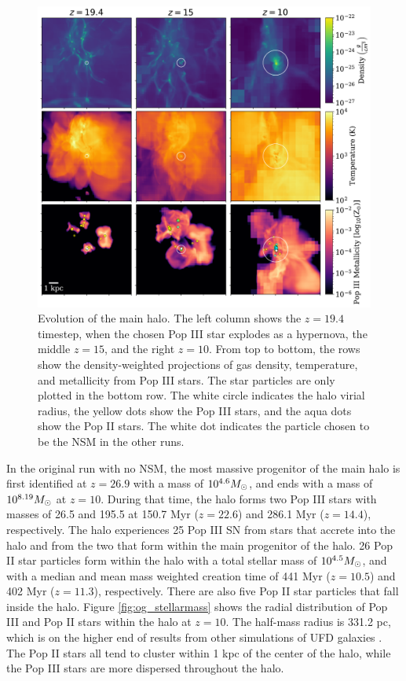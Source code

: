 \documentclass[fleqn,usenatbib]{mnras}
\begin{document}
\begin{figure} 
	\includegraphics[width=\textwidth]{plots/OG_evolution.pdf}
	\caption[Projections of the density, temperature and Pop III metallicity of the main halo through time.]{Evolution of the main halo. The left column shows the $z = 19.4$ timestep, when the chosen Pop III star explodes as a hypernova, the middle $z = 15$, and the right $z = 10$. From top to bottom, the rows show the density-weighted projections of gas density, temperature, and metallicity from Pop III stars. The star particles are only plotted in the bottom row. The white circle indicates the halo virial radius, the yellow dots show the Pop III stars, and the aqua dots show the Pop II stars. The white dot indicates the particle chosen to be the NSM in the other runs.}
	\label{fig:og_evolution}
\end{figure}

In the original run with no NSM, the most massive progenitor of the main halo is first identified at $z = 26.9$ with a mass of $10^{4.6} \Ms$, and ends with a mass of $10^{8.19} \Ms$ at $z = 10$. During that time, the halo forms two Pop III stars with masses of 26.5 \Ms{} and 195.5 \Ms{} at 150.7 Myr ($z = 22.6$) and 286.1 Myr ($z = 14.4$), respectively. The halo experiences 25 Pop III SN from stars that accrete into the halo and from the two that form within the main progenitor of the halo. 26 Pop II star particles form within the halo with a total stellar mass of $10^{4.5} \Ms$, and with a median and mean mass weighted creation time of 441 Myr ($z = 10.5$) and 402 Myr ($z = 11.3$), respectively. There are also five Pop II star particles that fall inside the halo. Figure \ref{fig:og_stellarmass} shows the radial distribution of Pop III and Pop II stars within the halo at $z = 10$. The half-mass radius is 331.2 pc, which is on the higher end of results from other simulations of UFD galaxies \citep{Ricotti16}. The Pop II stars all tend to cluster within 1 kpc of the center of the halo, while the Pop III stars are more dispersed throughout the halo. 
\end{document}
